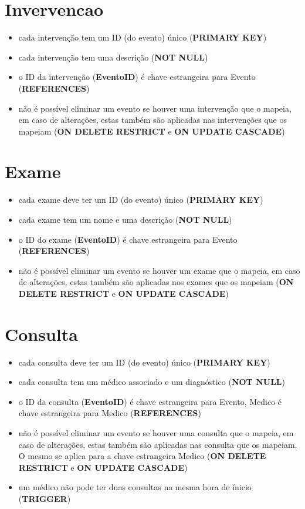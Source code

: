\documentclass[article, a4paper, 12pt, oneside]{memoir}
\begin{document}
\section*{Invervencao}
\begin{itemize}
	\item cada intervenção tem um ID (do evento) único (\textbf{PRIMARY KEY})
	\item cada intervenção tem uma descrição (\textbf{NOT NULL})
	\item o ID da intervenção (\textbf{EventoID}) é chave estrangeira para Evento (\textbf{REFERENCES})
	\item não é possível eliminar um evento se houver uma intervenção que o mapeia, em caso de alterações, estas também são aplicadas nas intervenções que os mapeiam (\textbf{ON DELETE RESTRICT} e \textbf{ON UPDATE CASCADE})
\end{itemize}

\section*{Exame}
\begin{itemize}
	\item cada exame deve ter um ID (do evento) único (\textbf{PRIMARY KEY})
	\item cada exame tem um nome e uma descrição (\textbf{NOT NULL})
	\item o ID do exame (\textbf{EventoID}) é chave estrangeira para Evento (\textbf{REFERENCES})
	\item não é possível eliminar um evento se houver um exame que o mapeia, em caso de alterações, estas também são aplicadas nos exames que os mapeiam (\textbf{ON DELETE RESTRICT} e \textbf{ON UPDATE CASCADE})
\end{itemize}

\section*{Consulta}
\begin{itemize}
	\item cada consulta deve ter um ID (do evento) único (\textbf{PRIMARY KEY})
	\item cada consulta tem um médico associado e um diagnóstico (\textbf{NOT NULL})
	\item o ID da consulta (\textbf{EventoID}) é chave estrangeira para Evento, Medico é chave estrangeira para Medico (\textbf{REFERENCES})
	\item não é possível eliminar um evento se houver uma consulta que o mapeia, em caso de alterações, estas também são aplicadas nas consulta que os mapeiam. O mesmo se aplica para a chave estrangeira Medico (\textbf{ON DELETE RESTRICT} e \textbf{ON UPDATE CASCADE})
	\item um médico não pode ter duas consultas na mesma hora de ínicio (\textbf{TRIGGER})
\end{itemize}
\end{document}
